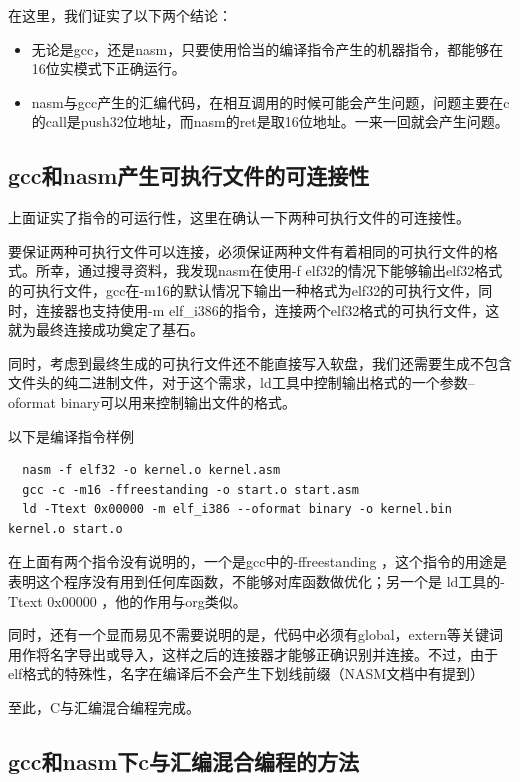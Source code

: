 \documentclass[forprint]{WHUBachelor}
\begin{document}
在这里，我们证实了以下两个结论：

\begin{itemize}
  \item 无论是gcc，还是nasm，只要使用恰当的编译指令产生的机器指令，都能够在16位实模式下正确运行。
  \item nasm与gcc产生的汇编代码，在相互调用的时候可能会产生问题，问题主要在c的call是push32位地址，而nasm的ret是取16位地址。一来一回就会产生问题。
\end{itemize}

\subsection{gcc和nasm产生可执行文件的可连接性}

上面证实了指令的可运行性，这里在确认一下两种可执行文件的可连接性。

要保证两种可执行文件可以连接，必须保证两种文件有着相同的可执行文件的格式。所幸，通过搜寻资料，我发现nasm在使用-f elf32的情况下能够输出elf32格式的可执行文件，gcc在-m16的默认情况下输出一种格式为elf32的可执行文件，同时，连接器也支持使用-m elf\_i386的指令，连接两个elf32格式的可执行文件，这就为最终连接成功奠定了基石。

同时，考虑到最终生成的可执行文件还不能直接写入软盘，我们还需要生成不包含文件头的纯二进制文件，对于这个需求，ld工具中控制输出格式的一个参数--oformat binary可以用来控制输出文件的格式。

以下是编译指令样例

\begin{lstlisting}
  nasm -f elf32 -o kernel.o kernel.asm
  gcc -c -m16 -ffreestanding -o start.o start.asm
  ld -Ttext 0x00000 -m elf_i386 --oformat binary -o kernel.bin kernel.o start.o
\end{lstlisting}

在上面有两个指令没有说明的，一个是gcc中的-ffreestanding ，这个指令的用途是表明这个程序没有用到任何库函数，不能够对库函数做优化；另一个是 ld工具的-Ttext 0x00000 ，他的作用与org类似。

同时，还有一个显而易见不需要说明的是，代码中必须有global，extern等关键词用作将名字导出或导入，这样之后的连接器才能够正确识别并连接。不过，由于elf格式的特殊性，名字在编译后不会产生下划线前缀（NASM文档中有提到）

至此，C与汇编混合编程完成。

\subsection{gcc和nasm下c与汇编混合编程的方法}
\end{document}
